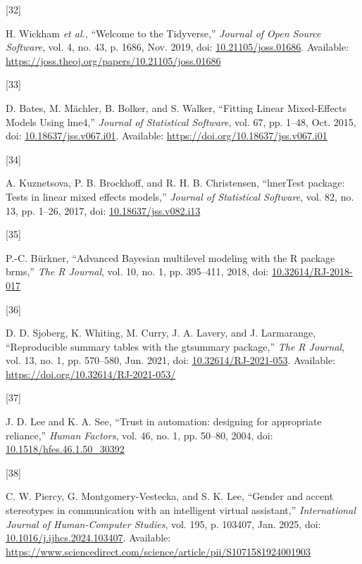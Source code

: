 \documentclass[
  letterpaper,
  DIV=11,
  numbers=noendperiod]{scrartcl}
\newlength{\cslhangindent}
\newlength{\csllabelwidth}
\newenvironment{CSLReferences}[2] %
 {\begin{list}{}{%
  \setlength{\itemindent}{0pt}
  \setlength{\leftmargin}{0pt}
  \setlength{\parsep}{0pt}
  \ifodd #1
   \setlength{\leftmargin}{\cslhangindent}
   \setlength{\itemindent}{-1\cslhangindent}
  \fi
  \setlength{\itemsep}{#2\baselineskip}}}
 {\end{list}}
\newcommand{\CSLLeftMargin}[1]{\parbox[t]{\csllabelwidth}{\strut#1\strut}}
\newcommand{\CSLRightInline}[1]{\parbox[t]{\linewidth - \csllabelwidth}{\strut#1\strut}}
\begin{document}
\begin{CSLReferences}{0}{0}
\CSLLeftMargin{{[}32{]} }%
\CSLRightInline{H. Wickham \emph{et al.}, {``Welcome to the
Tidyverse,''} \emph{Journal of Open Source Software}, vol. 4, no. 43, p.
1686, Nov. 2019, doi:
\href{https://doi.org/10.21105/joss.01686}{10.21105/joss.01686}.
Available: \url{https://joss.theoj.org/papers/10.21105/joss.01686}}

\CSLLeftMargin{{[}33{]} }%
\CSLRightInline{D. Bates, M. Mächler, B. Bolker, and S. Walker,
{``Fitting Linear Mixed-Effects Models Using lme4,''} \emph{Journal of
Statistical Software}, vol. 67, pp. 1--48, Oct. 2015, doi:
\href{https://doi.org/10.18637/jss.v067.i01}{10.18637/jss.v067.i01}.
Available: \url{https://doi.org/10.18637/jss.v067.i01}}

\CSLLeftMargin{{[}34{]} }%
\CSLRightInline{A. Kuznetsova, P. B. Brockhoff, and R. H. B.
Christensen, {``{lmerTest} package: Tests in linear mixed effects
models,''} \emph{Journal of Statistical Software}, vol. 82, no. 13, pp.
1--26, 2017, doi:
\href{https://doi.org/10.18637/jss.v082.i13}{10.18637/jss.v082.i13}}

\CSLLeftMargin{{[}35{]} }%
\CSLRightInline{P.-C. Bürkner, {``Advanced {Bayesian} multilevel
modeling with the {R} package {brms},''} \emph{The R Journal}, vol. 10,
no. 1, pp. 395--411, 2018, doi:
\href{https://doi.org/10.32614/RJ-2018-017}{10.32614/RJ-2018-017}}

\CSLLeftMargin{{[}36{]} }%
\CSLRightInline{D. D. Sjoberg, K. Whiting, M. Curry, J. A. Lavery, and
J. Larmarange, {``Reproducible summary tables with the gtsummary
package,''} \emph{The R Journal}, vol. 13, no. 1, pp. 570--580, Jun.
2021, doi:
\href{https://doi.org/10.32614/RJ-2021-053}{10.32614/RJ-2021-053}.
Available: \url{https://doi.org/10.32614/RJ-2021-053/}}

\CSLLeftMargin{{[}37{]} }%
\CSLRightInline{J. D. Lee and K. A. See, {``Trust in automation:
designing for appropriate reliance,''} \emph{Human Factors}, vol. 46,
no. 1, pp. 50--80, 2004, doi:
\href{https://doi.org/10.1518/hfes.46.1.50_30392}{10.1518/hfes.46.1.50\_30392}}

\CSLLeftMargin{{[}38{]} }%
\CSLRightInline{C. W. Piercy, G. Montgomery-Vestecka, and S. K. Lee,
{``Gender and accent stereotypes in communication with an intelligent
virtual assistant,''} \emph{International Journal of Human-Computer
Studies}, vol. 195, p. 103407, Jan. 2025, doi:
\href{https://doi.org/10.1016/j.ijhcs.2024.103407}{10.1016/j.ijhcs.2024.103407}.
Available:
\url{https://www.sciencedirect.com/science/article/pii/S1071581924001903}}


\end{CSLReferences}
\end{document}
